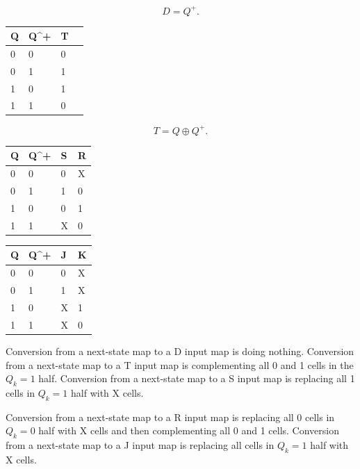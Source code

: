 \documentclass[a4paper,12pt]{report}
\begin{document}
\[D=Q^+.\]
\begin{longtable}[c]{mm|mm}
\hline
Q & Q^+ & T \\\hline
0 & 0 & 0 \\\hline
0 & 1 & 1 \\\hline
1 & 0 & 1 \\\hline
1 & 1 & 0 \\\hline
\end{longtable}
\[T=Q\oplus Q^+.\]
\begin{longtable}[c]{mm|mm}
\hline
Q & Q^+ & S & R \\\hline
0 & 0 & 0 & X \\\hline
0 & 1 & 1 & 0 \\\hline
1 & 0 & 0 & 1 \\\hline
1 & 1 & X & 0 \\\hline
\end{longtable}
\begin{longtable}[c]{mm|mm}
\hline
Q & Q^+ & J & K \\\hline
0 & 0 & 0 & X \\\hline
0 & 1 & 1 & X \\\hline
1 & 0 & X & 1 \\\hline
1 & 1 & X & 0 \\\hline
\end{longtable}
Conversion from a next-state map to a D input map is doing nothing.
Conversion from a next-state map to a T input map is complementing all 0 and 1 cells in the $Q_k=1$ half.
Conversion from a next-state map to a S input map is replacing all 1 cells in $Q_k=1$ half with X cells.

Conversion from a next-state map to a R input map is replacing all 0 cells in $Q_k=0$ half with X cells and then complementing all 0 and 1 cells.
Conversion from a next-state map to a J input map is replacing all cells in $Q_k=1$ half with X cells.
\end{document}
